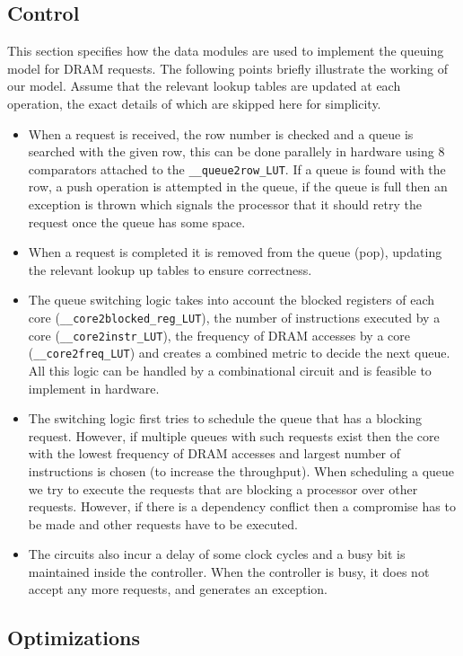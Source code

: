 \documentclass[hidelinks,12pt]{article}
\begin{document}
\subsection{Control}
This section specifies how the data modules are used to implement the queuing model for DRAM requests.
The following points briefly illustrate the working of our model. Assume that the relevant lookup tables are updated
at each operation, the exact details of which are skipped here for simplicity.
\begin{itemize}
    \item When a request is received, the row number is checked and a queue is searched with the given row, this can be done parallely in hardware using
          8 comparators attached to the \verb|__queue2row_LUT|. If a queue is found with the row, a push operation is attempted in the queue, if the queue is full then
          an exception is thrown which signals the processor that it should retry the request once the queue has some space.
    \item When a request is completed it is removed from the queue (pop), updating the relevant lookup up tables to ensure correctness.
    \item The queue switching logic takes into account the blocked registers of each core (\verb|__core2blocked_reg_LUT|), the number of instructions executed by a core (\verb|__core2instr_LUT|), the frequency of DRAM accesses by a core (\verb|__core2freq_LUT|)
          and creates a combined metric to decide the next queue. All this logic can be handled by a combinational circuit and is feasible to implement in hardware.
    \item The switching logic first tries to schedule the queue that has a blocking request. However, if multiple queues with such requests exist then the core with the lowest frequency of DRAM accesses and largest number of instructions is chosen (to increase the throughput).
          When scheduling a queue we try to execute the requests that are blocking a processor over other requests. However, if there is a dependency conflict then a compromise has to be made and other requests have to be executed.
    \item The circuits also incur a delay of some clock cycles and a busy bit is maintained inside the controller. When the controller is busy, it does not accept any more requests, and generates an exception.
\end{itemize}
\subsection{Optimizations}
\end{document}
